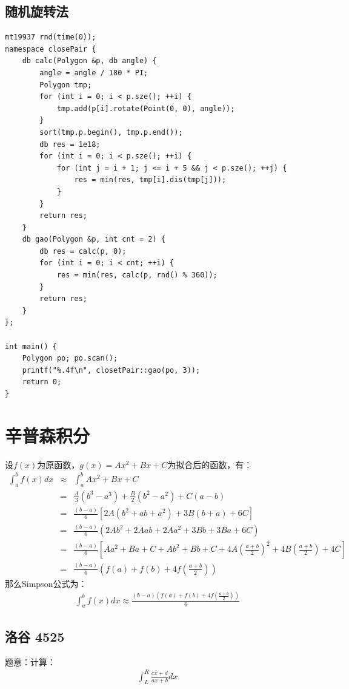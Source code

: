 \subsection{随机旋转法}

\begin{lstlisting}
mt19937 rnd(time(0));
namespace closePair {
	db calc(Polygon &p, db angle) {
		angle = angle / 180 * PI;
		Polygon tmp;
		for (int i = 0; i < p.sze(); ++i) {
			tmp.add(p[i].rotate(Point(0, 0), angle));
		}
		sort(tmp.p.begin(), tmp.p.end());
		db res = 1e18;
		for (int i = 0; i < p.sze(); ++i) {
			for (int j = i + 1; j <= i + 5 && j < p.sze(); ++j) {
				res = min(res, tmp[i].dis(tmp[j]));
			}	
		}
		return res;
	}
	db gao(Polygon &p, int cnt = 2) {
		db res = calc(p, 0);
		for (int i = 0; i < cnt; ++i) {
			res = min(res, calc(p, rnd() % 360));
		}
		return res;
	}
};

int main() {
	Polygon po; po.scan();
	printf("%.4f\n", closetPair::gao(po, 3));
	return 0;
}
\end{lstlisting}

\section{辛普森积分}
设$f(x)$为原函数，$g(x) = Ax^2 + Bx + C$为拟合后的函数，有：
\begin{eqnarray*}
\int_a^bf(x)dx&\approx& \int_a^bAx^2+Bx+C\\
&=&\frac{A}{3}(b^3-a^3)+\frac{B}{2}(b^2-a^2)+C(a-b)\\
&=&\frac{(b-a)}{6}[2A(b^2+ab+a^2)+3B(b+a)+6C]\\
&=&\frac{(b-a)}{6}(2Ab^2+2Aab+2Aa^2+3Bb+3Ba+6C)\\
&=&\frac{(b-a)}{6}[Aa^2+Ba+C+Ab^2+Bb+C+4A(\frac{a+b}{2})^2+4B(\frac{a+b}{2})+4C]\\
&=&\frac{(b-a)}{6}(f(a)+f(b)+4f(\frac{a+b}{2}))
\end{eqnarray*}
那么Simpson公式为：
\begin{eqnarray*}
\int_a^bf(x)dx\approx\frac{(b-a)(f(a)+f(b)+4f(\frac{a+b}{2}))}{6}
\end{eqnarray*}

\subsection{洛谷 4525}
题意：计算：
\begin{eqnarray*}
\int_L^R \frac{cx + d}{ax + b} dx
\end{eqnarray*}

